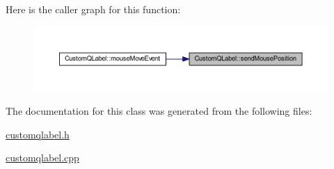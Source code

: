 Here is the caller graph for this function\+:\nopagebreak
\begin{figure}[H]
\begin{center}
\leavevmode
\includegraphics[width=350pt]{class_custom_q_label_ac07a9c61c0ac4df046b70cbec46e1af5_icgraph}
\end{center}
\end{figure}


The documentation for this class was generated from the following files\+:\begin{DoxyCompactItemize}
\item 
\mbox{\hyperlink{customqlabel_8h}{customqlabel.\+h}}\item 
\mbox{\hyperlink{customqlabel_8cpp}{customqlabel.\+cpp}}\end{DoxyCompactItemize}
